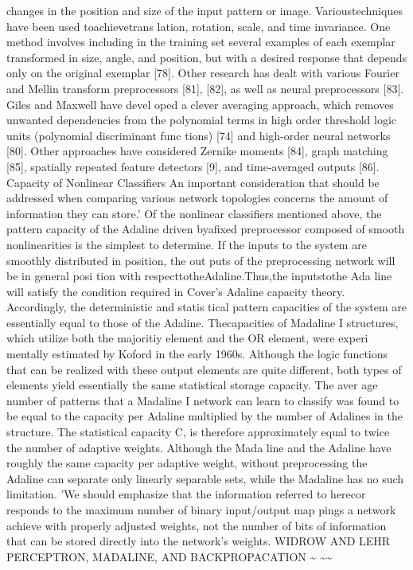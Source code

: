 \documentclass[11pt,a4paper,twocolumn]{article}
\begin{document}
changes in the position and size of the input pattern or 
image. Varioustechniques have been used toachievetrans
lation, rotation, scale, and time invariance. One method 
involves including in the training set several examples of 
each exemplar transformed in size, angle, and position, but 
with a desired response that depends only on the original 
exemplar [78]. Other research has dealt with various Fourier 
and Mellin transform preprocessors [81], [82], as well as 
neural preprocessors [83]. Giles and Maxwell have devel
oped a clever averaging approach, which removes 
unwanted dependencies from the polynomial terms in high
order threshold logic units (polynomial discriminant func
tions) [74] and high-order neural networks [80]. Other 
approaches have considered Zernike moments [84], graph 
matching [85], spatially repeated feature detectors [9], and 
time-averaged outputs [86]. 
Capacity of Nonlinear Classifiers 
An important consideration that should be addressed 
when comparing various network topologies concerns the 
amount of information they can store.’ Of the nonlinear 
classifiers mentioned above, the pattern capacity of the 
Adaline driven byafixed preprocessor composed of smooth 
nonlinearities is the simplest to determine. If the inputs to 
the system are smoothly distributed in position, the out
puts of the preprocessing network will be in general posi
tion with respecttotheAdaline.Thus,the inputstothe Ada
line will satisfy the condition required in Cover’s Adaline 
capacity theory. Accordingly, the deterministic and statis
tical pattern capacities of the system are essentially equal 
to those of the Adaline. 
Thecapacities of Madaline I structures, which utilize both 
the majoritiy element and the OR element, were experi
mentally estimated by Koford in the early 1960s. Although 
the logic functions that can be realized with these output 
elements are quite different, both types of elements yield 
essentially the same statistical storage capacity. The aver
age number of patterns that a Madaline I network can learn 
to classify was found to be equal to the capacity per Adaline 
multiplied by the number of Adalines in the structure. The 
statistical capacity C, is therefore approximately equal to 
twice the number of adaptive weights. Although the Mada
line and the Adaline have roughly the same capacity per 
adaptive weight, without preprocessing the Adaline can 
separate only linearly separable sets, while the Madaline 
has no such limitation. 
’We should emphasize that the information referred to herecor
responds to the maximum number of binary input/output map
pings a network achieve with properly adjusted weights, not the 
number of bits of information that can be stored directly into the 
network’s weights. 
WIDROW AND LEHR PERCEPTRON, MADALINE, AND BACKPROPACATION 
\~{} 
\~{}\~{} 
\end{document}
